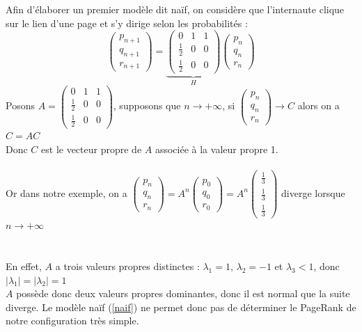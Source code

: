 \documentclass[a4paper,10pt]{report}
\begin{document}
Afin d'élaborer un premier modèle dit naïf, on considère que l'internaute clique sur le lien d'une page et s'y dirige selon les probabilités :
\begin{equation}
\left( \begin{array}{c} p_{n+1} \\ q_{n+1} \\ r_{n+1} \end{array} \right)
= \underbrace{\left( \begin{array}{ccc} 0 & 1 & 1 \\ \frac{1}{2} & 0 & 0 \\ \frac{1}{2} & 0 & 0 \end{array} \right)}_H
\left( \begin{array}{c} p_{n} \\ q_{n} \\ r_{n} \end{array} \right)
\label{naif}
\end{equation}
Posons $A=\left( \begin{array}{ccc} 0 & 1 & 1 \\ \frac{1}{2} & 0 & 0 \\ \frac{1}{2} & 0 & 0 \end{array} \right)$, supposons que $n\longrightarrow +\infty$, si $\left( \begin{array}{c} p_{n} \\ q_{n} \\ r_{n} \end{array} \right)\longrightarrow C$ alors on a $C=AC$\\
Donc $C$ est le vecteur propre de $A$ associée à la valeur propre 1.\\ \\

\indent Or dans notre exemple, on a $\left( \begin{array}{c} p_{n} \\ q_{n} \\ r_{n} \end{array} \right)=A^n\left( \begin{array}{c} p_{0} \\ q_{0} \\ r_{0} \end{array} \right)=A^n\left( \begin{array}{c} \frac{1}{3} \\ \frac{1}{3} \\ \frac{1}{3} \end{array} \right)$ diverge lorsque $n\longrightarrow +\infty$\\ \\ \\
En effet, $A$ a trois valeurs propres distinctes : $\lambda_1=1$, $\lambda_2=-1$ et $\lambda_3<1$, donc $|\lambda_1|=|\lambda_2|=1$\\
$A$ possède donc deux valeurs propres dominantes, donc il est normal que la suite diverge. Le modèle naïf (\ref{naif}) ne permet donc pas de déterminer le PageRank de notre configuration très simple.\\ \\
\end{document}
